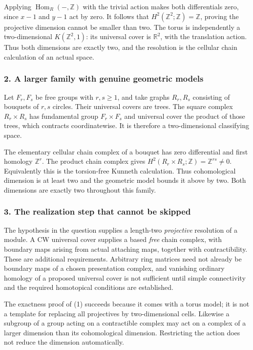 \documentclass[11pt,a4paper]{article}
\begin{document}
Applying $\operatorname{Hom}_R(-,\mathbb Z)$ with the trivial action makes both differentials zero, since $x-1$ and $y-1$ act by zero. It follows that $H^2(\mathbb Z^2;\mathbb Z)=\mathbb Z$, proving the projective dimension cannot be smaller than two. The torus is independently a two-dimensional $K(\mathbb Z^2,1)$: its universal cover is $\mathbb R^2$, with the translation action. Thus both dimensions are exactly two, and the resolution is the cellular chain calculation of an actual space.

\subsubsection{2. A larger family with genuine geometric models}
Let $F_r,F_s$ be free groups with $r,s\geq1$, and take graphs $R_r,R_s$ consisting of bouquets of $r,s$ circles. Their universal covers are trees. The square complex $R_r\times R_s$ has fundamental group $F_r\times F_s$ and universal cover the product of those trees, which contracts coordinatewise. It is therefore a two-dimensional classifying space.

The elementary cellular chain complex of a bouquet has zero differential and first homology $\mathbb Z^r$. The product chain complex gives $H^2(R_r\times R_s;\mathbb Z)=\mathbb Z^{rs}\ne0$. Equivalently this is the torsion-free Kunneth calculation. Thus cohomological dimension is at least two and the geometric model bounds it above by two. Both dimensions are exactly two throughout this family.

\subsubsection{3. The realization step that cannot be skipped}
The hypothesis in the question supplies a length-two \emph{projective} resolution of a module. A CW universal cover supplies a based \emph{free} chain complex, with boundary maps arising from actual attaching maps, together with contractibility. These are additional requirements. Arbitrary ring matrices need not already be boundary maps of a chosen presentation complex, and vanishing ordinary homology of a proposed universal cover is not sufficient until simple connectivity and the required homotopical conditions are established.

The exactness proof of (1) succeeds because it comes with a torus model; it is not a template for replacing all projectives by two-dimensional cells. Likewise a subgroup of a group acting on a contractible complex may act on a complex of a larger dimension than its cohomological dimension. Restricting the action does not reduce the dimension automatically.
\end{document}
